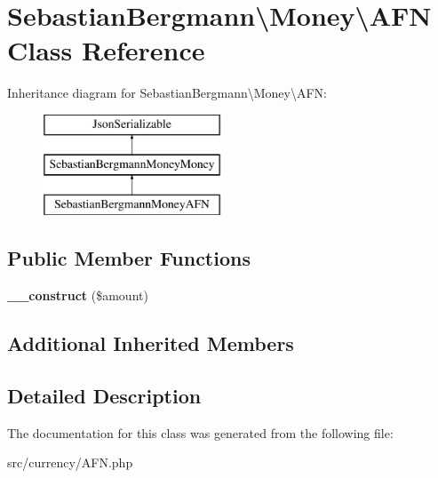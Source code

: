 \hypertarget{classSebastianBergmann_1_1Money_1_1AFN}{}\section{Sebastian\+Bergmann\textbackslash{}Money\textbackslash{}A\+F\+N Class Reference}
\label{classSebastianBergmann_1_1Money_1_1AFN}
Inheritance diagram for Sebastian\+Bergmann\textbackslash{}Money\textbackslash{}A\+F\+N\+:\begin{figure}[H]
\begin{center}
\leavevmode
\includegraphics[height=3.000000cm]{classSebastianBergmann_1_1Money_1_1AFN}
\end{center}
\end{figure}
\subsection*{Public Member Functions}
\begin{DoxyCompactItemize}
\item 
\hypertarget{classSebastianBergmann_1_1Money_1_1AFN_a70941e70361ea27c091cd68691218c0a}{}{\bfseries \+\_\+\+\_\+construct} (\$amount)\label{classSebastianBergmann_1_1Money_1_1AFN_a70941e70361ea27c091cd68691218c0a}

\end{DoxyCompactItemize}
\subsection*{Additional Inherited Members}


\subsection{Detailed Description}


The documentation for this class was generated from the following file\+:\begin{DoxyCompactItemize}
\item 
src/currency/A\+F\+N.\+php\end{DoxyCompactItemize}
